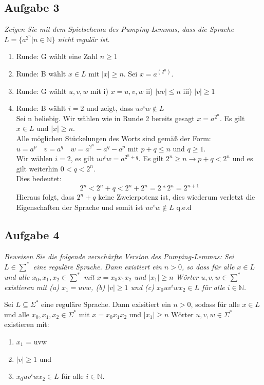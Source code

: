 \documentclass[a4paper]{article}
\begin{document}
\subsection{Aufgabe 3}
\textit{Zeigen Sie mit dem Spielschema des Pumping-Lemmas, dass die Sprache $L=\{a^{2^n} | n\in\mathbb{N}\}$ nicht regulär ist.}

\begin{enumerate}
    \item Runde: G wählt eine Zahl $n\geq 1$
    \item Runde: B wählt $x\in L$ mit $\mid x\mid\geq n$. Sei $x = a^{(2^n)}$.
    \item Runde: G wählt $u,v,w$ mit i) $x = u,v,w$ ii) $\mid uv\mid\leq n$ iii) $\mid v\mid\geq 1$
    \item Runde: B wählt $i = 2$ und zeigt, dass $uv^iw \not\in L$ \\
          Sei n beliebig. Wir wählen wie in Runde 2 bereits gesagt $x=a^{2^n}$. Es gilt $x\in L$ und $\mid x\mid\geq n$.\\
          Alle möglichen Stückelungen des Worts sind gemäß der Form: $ u = a^p \quad v = a^q \quad w = a^{2^n}-a^q-a^p$
          mit $p+q \leq n$ und $q\geq 1$.\\
          Wir wählen $i=2$, es gilt $uv^iw = a^{{2^n}+q}$. Es gilt $2^n \geq n \rightarrow p+q < 2^n$ und es gilt weiterhin $0 < q < 2^n$.\\
          Dies bedeutet:$$2^n < 2^n+q < 2^n+2^n = 2*2^n = 2^{n+1}$$
          Hieraus folgt, dass $2^n+q$ keine Zweierpotenz ist, dies wiederum verletzt die Eigenschaften der Sprache und somit ist $uv^iw \notin L$ q.e.d
\end{enumerate}

\subsection{Aufgabe 4}
\textit{Beweisen Sie die folgende verschärfte Version des Pumping-Lemmas: Sei $L\in\sum^*$ eine reguläre Sprache. Dann existiert ein $n>0$, so dass für alle $x\in L$ und alle $x_0,x_1,x_2\in\sum^*$ mit $x=x_0x_1x_2$ und $|x_1|\geq n$ Wörter $u, v, w \in\sum^*$ existieren mit (a) $x_1 = uvw$, (b) $|v| \geq 1$ und
    (c) $x_0 uv^i wx_2\in L$ für alle $i\in\mathbb{N}$.}

Sei $L\subseteq\Sigma^*$ eine reguläre Sprache. Dann exisitiert ein $n>0$, sodass für alle $x\in L$ und alle $x_0,x_1,x_2 \in \Sigma^*$ mit $x = x_0x_1x_2$ und $\mid x_1 \mid \geq n$ Wörter $u,v,w\in \Sigma^*$ existieren mit:
\begin{enumerate}
    \item $x_1$ = uvw
    \item $\mid v \mid \geq 1$ und
    \item $x_0uv^iwx_2 \in L$ für alle $i\in\mathbb{N}$.
\end{enumerate}
\end{document}
